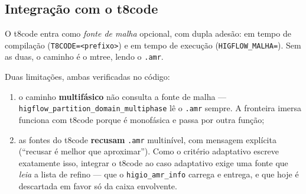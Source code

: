 \subsection{Integra\c{c}\~ao com o t8code}

O t8code entra como \emph{fonte de malha} opcional, com dupla ades\~ao: em tempo
de compila\c{c}\~ao (\texttt{T8CODE=<prefixo>}) e em tempo de execu\c{c}\~ao
(\texttt{HIGFLOW\_MALHA=}). Sem as duas, o caminho \'e o mtree, lendo o
\texttt{.amr}.

Duas limita\c{c}\~oes, ambas verificadas no c\'odigo:

\begin{enumerate}
  \item o caminho \textbf{multif\'asico} n\~ao consulta a fonte de malha ---
    \texttt{higflow\_\allowbreak{}partition\_\allowbreak{}domain\_\allowbreak{}multiphase} l\^e o \texttt{.amr} sempre.
    A fronteira imersa funciona com t8code porque \'e monof\'asica e passa por
    outra fun\c{c}\~ao;
  \item as fontes do t8code \textbf{recusam} \texttt{.amr} multin\'ivel, com
    mensagem expl\'icita (``recusar \'e melhor que aproximar''). Como o
    crit\'erio adaptativo escreve exatamente isso, integrar o t8code ao caso
    adaptativo exige uma fonte que \emph{leia} a lista de refino --- que o
    \texttt{higio\_amr\_info} carrega e entrega, e que hoje \'e descartada em
    favor s\'o da caixa envolvente.
\end{enumerate}
